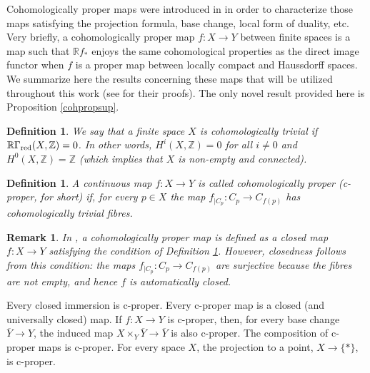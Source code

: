 \documentclass[amssymb,amscd,11pt,20pt]{amsart}
\newcommand{\ZZ}{{\mathbb Z}}
\newcommand{\RR}{\mathbb R}
\newcommand{\0}{\mathbf 0}
\theoremstyle{plain}
\newtheorem{defn}[thm]{Definition}
\newtheorem{rem}[thm]{Remark}
\numberwithin{equation}{thm}
\begin{document}
\bigskip
{} Cohomologically proper maps were introduced in \cite{Sanchoetal} in order to characterize those maps satisfying the projection formula, base change, local form of duality, etc. Very briefly, a cohomologically proper map $f\colon X\to Y$ between finite spaces is a map such that $\RR f_*$ enjoys the same cohomological properties as the direct image functor  when $f$ is a proper map between locally compact and Haussdorff spaces. We summarize here  the results concerning these maps that  will be utilized throughout this work  (see \cite{Sanchoetal} for their proofs). The only novel result provided here  is Proposition \ref{cohpropsup}.

\begin{defn}\label{c-trivial}{\rm We say that a finite space $X$ is {\em cohomologically trivial} if $\RR\Gamma_{\text{\rm red}}(X,\ZZ)=0$. In other words, $H^i(X,\ZZ)=0$ for all $i\neq 0$ and $H^0(X,\ZZ)=\ZZ$ (which implies that $X$ is non-empty and connected).
}
\end{defn}

\begin{defn}\label{c-proper}{\rm A continuous map $f\colon X\to Y$ is called {\em cohomologically proper} ({\em c-proper}, for short) if, for every $p\in X$ the map $f_{\vert C_p}\colon C_p\to C_{f(p)}$ has cohomologically trivial fibres.}
\end{defn}

\begin{rem}{\rm In \cite{Sanchoetal}, a cohomologically proper map is defined as a {\em closed} map $f\colon X\to Y$ satisfying the condition of Definition \ref{c-proper}. However, closedness follows from this condition:  the maps $f_{\vert C_p}\colon C_p\to C_{f(p)}$ are surjective because the fibres are not empty, and hence $f$ is automatically closed.}
\end{rem}

Every closed immersion is c-proper. Every c-proper map is a closed (and universally closed) map. If $f\colon X\to Y$ is c-proper, then, for every base change $\overline Y\to Y$, the induced map $X\times_Y\overline Y\to\overline Y$ is also c-proper. The composition of c-proper maps is c-proper. For every space $X$, the projection to a point, $X\to\{*\}$, is c-proper.
\end{document}
